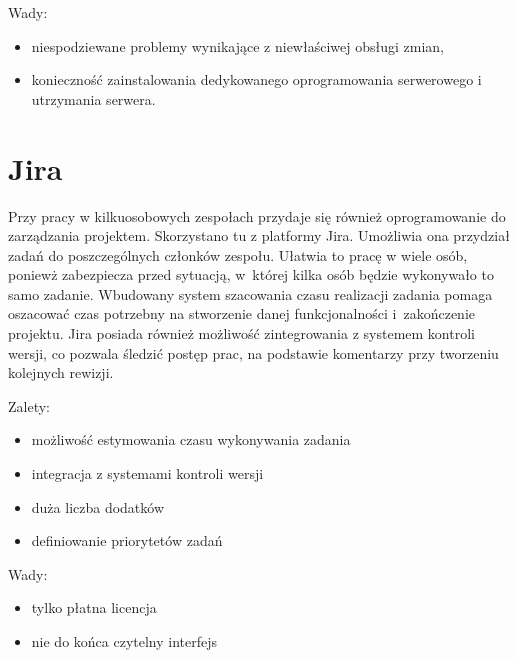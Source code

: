 \raggedright Wady:
\begin{itemize}
\item niespodziewane problemy wynikające z niewłaściwej obsługi zmian,
\item konieczność zainstalowania dedykowanego oprogramowania serwerowego i utrzymania serwera.
\end{itemize}

\section{Jira}

Przy pracy w kilkuosobowych zespołach przydaje się również oprogramowanie do zarządzania projektem. Skorzystano tu z platformy Jira. Umożliwia ona przydział zadań do poszczególnych członków zespołu. Ułatwia to pracę w wiele osób, poniewż zabezpiecza przed sytuacją, w~której kilka osób będzie wykonywało to samo zadanie. Wbudowany system szacowania czasu realizacji zadania pomaga oszacować czas potrzebny na stworzenie danej funkcjonalności i~zakończenie projektu. Jira posiada również możliwość zintegrowania z systemem kontroli wersji, co pozwala śledzić postęp prac, na podstawie komentarzy przy tworzeniu kolejnych rewizji.

Zalety:
\begin{itemize}
\item możliwość estymowania czasu wykonywania zadania
\item integracja z systemami kontroli wersji
\item duża liczba dodatków
\item definiowanie priorytetów zadań
\end{itemize}

Wady:
\begin{itemize}
\item tylko płatna licencja
\item nie do końca czytelny interfejs
\end{itemize}